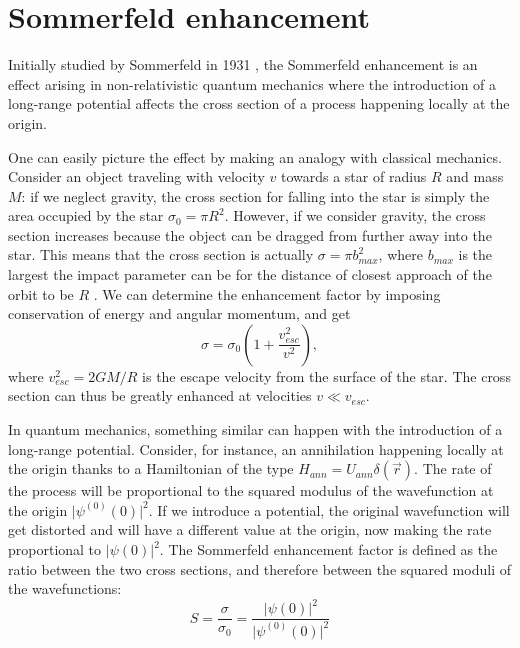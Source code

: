 \section{Sommerfeld enhancement}

Initially studied by Sommerfeld in 1931 \cite{Sommerfeld_1931}, the Sommerfeld enhancement is an effect arising in non-relativistic quantum mechanics where the introduction of a long-range potential affects the cross section of a process happening locally at the origin.

One can easily picture the effect by making an analogy with classical mechanics. Consider an object traveling with velocity \(v\) towards a star of radius \(R\) and mass \(M\): if we neglect gravity, the cross section for falling into the star is simply the area occupied by the star \(\sigma _0=\pi R^2\). However, if we consider gravity, the cross section increases because the object can be dragged from further away into the star. This means that the cross section is actually \(\sigma = \pi b_{max}^2 \), where \(b_{max}\) is the largest the impact parameter can be for the distance of closest approach of the orbit to be \(R\) \cite{Arkani_2009, Cirelli_2024}. We can determine the enhancement factor by imposing conservation of energy and angular momentum, and get
\begin{equation}
	\sigma = \sigma _0 \left( 1+ \frac{v_{esc} ^2}{v ^2} \right), 
\end{equation}
where \(v_{esc} ^2 = 2GM / R\) is the escape velocity from the surface of the star. The cross section can thus be greatly enhanced at velocities \(v \ll v_{esc} \).

In quantum mechanics, something similar can happen with the introduction of a long-range potential. Consider, for instance, an annihilation happening locally at the origin thanks to a Hamiltonian of the type \(H_{ann} = U_{ann} \delta (\vec{r})\). The rate of the process will be proportional to the squared modulus of the wavefunction at the origin \(\vert \psi ^{(0)}(0) \vert^2 \). If we introduce a potential, the original wavefunction will get distorted and will have a different value at the origin, now making the rate proportional to \(\vert \psi (0) \vert^2 \). The Sommerfeld enhancement factor is defined as the ratio between the two cross sections, and therefore between the squared moduli of the wavefunctions:
\begin{equation}\label{eq:sommerfeld_def}
	S = \frac{\sigma }{\sigma _0} = \frac{\vert \psi (0) \vert ^2}{\vert \psi ^{(0)}(0) \vert ^2}
\end{equation}


